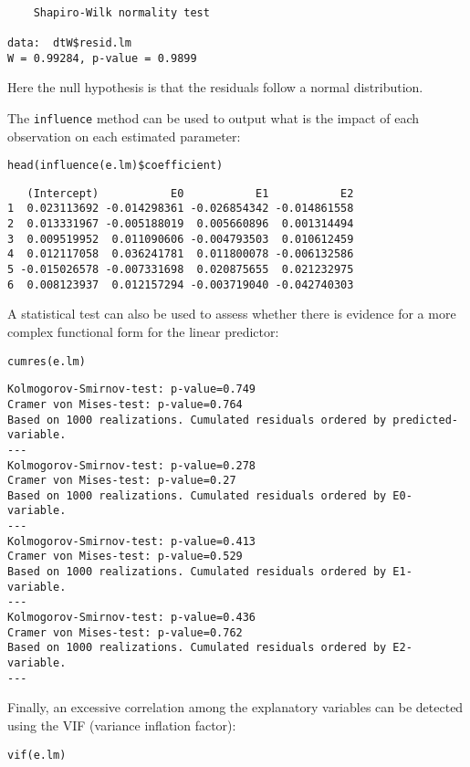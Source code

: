 \documentclass{article}
\begin{document}
\begin{verbatim}

	Shapiro-Wilk normality test

data:  dtW$resid.lm
W = 0.99284, p-value = 0.9899
\end{verbatim}
Here the null hypothesis is that the residuals follow a normal
distribution.

\bigskip

The \texttt{influence} method can be used to output what is the impact of
each observation on each estimated parameter:
\lstset{language=r,label= ,caption= ,captionpos=b,numbers=none}
\begin{lstlisting}
head(influence(e.lm)$coefficient)
\end{lstlisting}

\begin{verbatim}
   (Intercept)           E0           E1           E2
1  0.023113692 -0.014298361 -0.026854342 -0.014861558
2  0.013331967 -0.005188019  0.005660896  0.001314494
3  0.009519952  0.011090606 -0.004793503  0.010612459
4  0.012117058  0.036241781  0.011800078 -0.006132586
5 -0.015026578 -0.007331698  0.020875655  0.021232975
6  0.008123937  0.012157294 -0.003719040 -0.042740303
\end{verbatim}

\bigskip

A statistical test can also be used to assess whether there is
evidence for a more complex functional form for the linear predictor:
\lstset{language=r,label= ,caption= ,captionpos=b,numbers=none}
\begin{lstlisting}
cumres(e.lm)
\end{lstlisting}

\begin{verbatim}
Kolmogorov-Smirnov-test: p-value=0.749
Cramer von Mises-test: p-value=0.764
Based on 1000 realizations. Cumulated residuals ordered by predicted-variable.
---
Kolmogorov-Smirnov-test: p-value=0.278
Cramer von Mises-test: p-value=0.27
Based on 1000 realizations. Cumulated residuals ordered by E0-variable.
---
Kolmogorov-Smirnov-test: p-value=0.413
Cramer von Mises-test: p-value=0.529
Based on 1000 realizations. Cumulated residuals ordered by E1-variable.
---
Kolmogorov-Smirnov-test: p-value=0.436
Cramer von Mises-test: p-value=0.762
Based on 1000 realizations. Cumulated residuals ordered by E2-variable.
---
\end{verbatim}

\bigskip

Finally, an excessive correlation among the explanatory variables can
be detected using the VIF (variance inflation factor):
\lstset{language=r,label= ,caption= ,captionpos=b,numbers=none}
\begin{lstlisting}
vif(e.lm)
\end{lstlisting}
\end{document}
